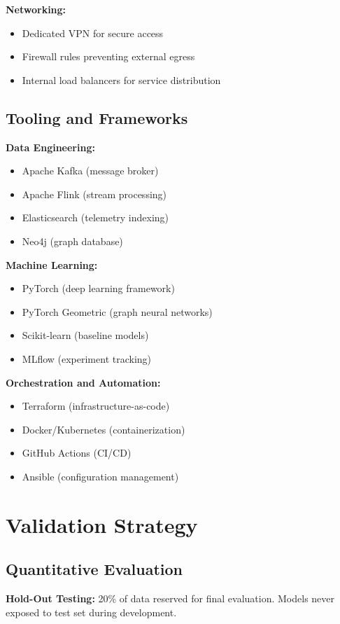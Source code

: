 \textbf{Networking:}
\begin{itemize}
    \item Dedicated VPN for secure access
    \item Firewall rules preventing external egress
    \item Internal load balancers for service distribution
\end{itemize}

\subsection{Tooling and Frameworks}
\textbf{Data Engineering:}
\begin{itemize}
    \item Apache Kafka (message broker)
    \item Apache Flink (stream processing)
    \item Elasticsearch (telemetry indexing)
    \item Neo4j (graph database)
\end{itemize}

\textbf{Machine Learning:}
\begin{itemize}
    \item PyTorch (deep learning framework)
    \item PyTorch Geometric (graph neural networks)
    \item Scikit-learn (baseline models)
    \item MLflow (experiment tracking)
\end{itemize}

\textbf{Orchestration and Automation:}
\begin{itemize}
    \item Terraform (infrastructure-as-code)
    \item Docker/Kubernetes (containerization)
    \item GitHub Actions (CI/CD)
    \item Ansible (configuration management)
\end{itemize}

\section{Validation Strategy}\label{sec:method-validation}
\subsection{Quantitative Evaluation}
\textbf{Hold-Out Testing:} 20\% of data reserved for final evaluation. Models never exposed to test set during development.

